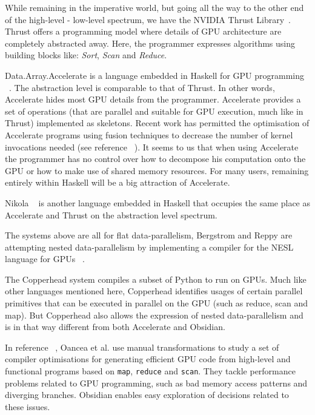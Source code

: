 While remaining in the imperative world, but going all the way to the 
other end of the high-level - low-level spectrum, we have the NVIDIA
Thrust Library~\cite{THRUST}.
Thrust offers a programming model where details of GPU architecture are 
completely abstracted away. Here, the programmer expresses algorithms 
using building blocks like: \emph{Sort}, \emph{Scan} and \emph{Reduce}.  

Data.Array.Accelerate is a language embedded in Haskell for GPU programming 
~\cite{ACCELERATEDAMP11}. The abstraction level is comparable to that of Thrust. In 
other words, Accelerate hides most GPU details from the programmer. Accelerate 
provides a set of operations (that are parallel and suitable for GPU execution, 
much like in Thrust) implemented as skeletons. Recent work has permitted
the optimisation of Accelerate programs using fusion techniques to decrease
the number of kernel invocations needed (see reference ~\cite{ACCOPT}).
It seems to us that when using Accelerate the programmer has no control over how to 
decompose his computation onto the GPU or how to make use of shared memory 
resources. For many users, remaining entirely within Haskell will be
a big attraction of Accelerate.     

Nikola ~\cite{NIKOLA} is another language embedded in Haskell that occupies the 
same place as Accelerate and Thrust on the abstraction level spectrum. 

The systems above are all for flat data-parallelism, Bergstrom 
and Reppy are attempting nested data-parallelism by implementing a 
compiler for the NESL language for GPUs ~\cite{NESL}. 


The Copperhead \cite{copperhead} system compiles a subset of Python to run 
on GPUs. Much like other languages mentioned here, Copperhead identifies 
usages of certain parallel primitives that can be executed in parallel 
on the GPU (such as reduce, scan and map). But Copperhead also 
allows the expression of nested data-parallelism and is in that 
way different from both Accelerate and Obsidian.   

In reference ~\cite{Finance}, Oancea et al. use manual transformations
to study a set of 
compiler optimisations for generating efficient GPU code from high-level 
and functional programs based on {\tt map}, {\tt reduce} and {\tt scan}. 
They tackle performance problems related to GPU programming, such as bad 
memory access patterns and diverging branches.
Obsidian enables easy exploration of decisions related to these issues.

